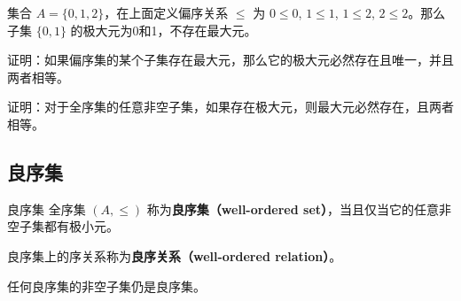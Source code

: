 \begin{example}{}
集合 $A=\{0,1,2\}$，在上面定义偏序关系 $\leq$ 为 $0\leq 0$, $1\leq 1$, $1\leq 2$, $2\leq 2$。那么子集 $\{0,1\}$ 的极大元为0和1，不存在最大元。
\end{example}

\begin{exercise}{}
证明：如果偏序集的某个子集存在最大元，那么它的极大元必然存在且唯一，并且两者相等。
\end{exercise}

\begin{exercise}{}
证明：对于全序集的任意非空子集，如果存在极大元，则最大元必然存在，且两者相等。
\end{exercise}

\subsection{良序集}

\begin{definition}{良序集}\label{OrdRel_def1}
全序集 $(A,\leq)$ 称为\textbf{良序集（well-ordered set）}，当且仅当它的任意非空子集都有极小元。
\end{definition}

良序集上的序关系称为\textbf{良序关系（well-ordered relation）}。

任何良序集的非空子集仍是良序集。